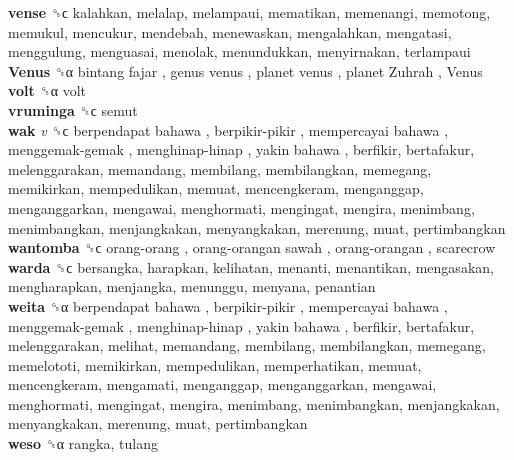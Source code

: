 \textbf{vense} ␝ϲ  kalahkan, melalap, melampaui, mematikan, memenangi, memotong, memukul, mencukur, mendebah, menewaskan, mengalahkan, mengatasi, menggulung, menguasai, menolak, menundukkan, menyirnakan, terlampaui  \\
\textbf{Venus} ␝α   bintang fajar ,  genus venus ,  planet venus ,  planet Zuhrah ,  Venus   \\
\textbf{volt} ␝α  volt  \\
\textbf{vruminga} ␝ϲ  semut  \\
\textbf{wak} \emph{v}  ␝ϲ   berpendapat bahawa ,  berpikir-pikir ,  mempercayai bahawa ,  menggemak-gemak ,  menghinap-hinap ,  yakin bahawa , berfikir, bertafakur, melenggarakan, memandang, membilang, membilangkan, memegang, memikirkan, mempedulikan, memuat, mencengkeram, menganggap, menganggarkan, mengawai, menghormati, mengingat, mengira, menimbang, menimbangkan, menjangkakan, menyangkakan, merenung, muat, pertimbangkan  \\
\textbf{wantomba} ␝ϲ   orang-orang ,  orang-orangan sawah ,  orang-orangan , scarecrow  \\
\textbf{warda} ␝ϲ  bersangka, harapkan, kelihatan, menanti, menantikan, mengasakan, mengharapkan, menjangka, menunggu, menyana, penantian  \\
\textbf{weita} ␝α   berpendapat bahawa ,  berpikir-pikir ,  mempercayai bahawa ,  menggemak-gemak ,  menghinap-hinap ,  yakin bahawa , berfikir, bertafakur, melenggarakan, melihat, memandang, membilang, membilangkan, memegang, memelototi, memikirkan, mempedulikan, memperhatikan, memuat, mencengkeram, mengamati, menganggap, menganggarkan, mengawai, menghormati, mengingat, mengira, menimbang, menimbangkan, menjangkakan, menyangkakan, merenung, muat, pertimbangkan  \\
\textbf{weso} ␝α  rangka, tulang  \\
